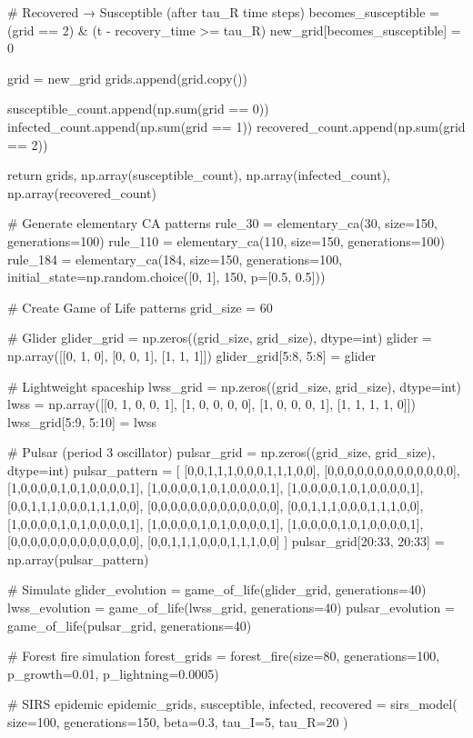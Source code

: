 \documentclass[a4paper, 11pt]{article}
\begin{document}
\begin{pycode}
        # Recovered → Susceptible (after tau_R time steps)
        becomes_susceptible = (grid == 2) & (t - recovery_time >= tau_R)
        new_grid[becomes_susceptible] = 0

        grid = new_grid
        grids.append(grid.copy())

        susceptible_count.append(np.sum(grid == 0))
        infected_count.append(np.sum(grid == 1))
        recovered_count.append(np.sum(grid == 2))

    return grids, np.array(susceptible_count), np.array(infected_count), np.array(recovered_count)

# Generate elementary CA patterns
rule_30 = elementary_ca(30, size=150, generations=100)
rule_110 = elementary_ca(110, size=150, generations=100)
rule_184 = elementary_ca(184, size=150, generations=100,
                         initial_state=np.random.choice([0, 1], 150, p=[0.5, 0.5]))

# Create Game of Life patterns
grid_size = 60

# Glider
glider_grid = np.zeros((grid_size, grid_size), dtype=int)
glider = np.array([[0, 1, 0],
                   [0, 0, 1],
                   [1, 1, 1]])
glider_grid[5:8, 5:8] = glider

# Lightweight spaceship
lwss_grid = np.zeros((grid_size, grid_size), dtype=int)
lwss = np.array([[0, 1, 0, 0, 1],
                 [1, 0, 0, 0, 0],
                 [1, 0, 0, 0, 1],
                 [1, 1, 1, 1, 0]])
lwss_grid[5:9, 5:10] = lwss

# Pulsar (period 3 oscillator)
pulsar_grid = np.zeros((grid_size, grid_size), dtype=int)
pulsar_pattern = [
    [0,0,1,1,1,0,0,0,1,1,1,0,0],
    [0,0,0,0,0,0,0,0,0,0,0,0,0],
    [1,0,0,0,0,1,0,1,0,0,0,0,1],
    [1,0,0,0,0,1,0,1,0,0,0,0,1],
    [1,0,0,0,0,1,0,1,0,0,0,0,1],
    [0,0,1,1,1,0,0,0,1,1,1,0,0],
    [0,0,0,0,0,0,0,0,0,0,0,0,0],
    [0,0,1,1,1,0,0,0,1,1,1,0,0],
    [1,0,0,0,0,1,0,1,0,0,0,0,1],
    [1,0,0,0,0,1,0,1,0,0,0,0,1],
    [1,0,0,0,0,1,0,1,0,0,0,0,1],
    [0,0,0,0,0,0,0,0,0,0,0,0,0],
    [0,0,1,1,1,0,0,0,1,1,1,0,0]
]
pulsar_grid[20:33, 20:33] = np.array(pulsar_pattern)

# Simulate
glider_evolution = game_of_life(glider_grid, generations=40)
lwss_evolution = game_of_life(lwss_grid, generations=40)
pulsar_evolution = game_of_life(pulsar_grid, generations=40)

# Forest fire simulation
forest_grids = forest_fire(size=80, generations=100, p_growth=0.01, p_lightning=0.0005)

# SIRS epidemic
epidemic_grids, susceptible, infected, recovered = sirs_model(
    size=100, generations=150, beta=0.3, tau_I=5, tau_R=20
)


\end{pycode}
\end{document}
